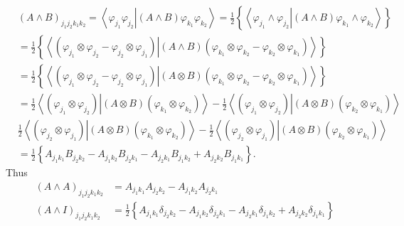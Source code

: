\documentclass[aps,preprint]{revtex4}%
\begin{document}
\begin{align}
&  \left(  A\wedge B\right)  _{j_{1}j_{2}k_{1}k_{2}}=\left\langle
\varphi_{j_{1}}\varphi_{j_{2}}\left\vert \left(  A\wedge B\right)
\varphi_{k_{1}}\varphi_{k_{2}}\right.  \right\rangle =\frac{1}{2}\left\{
\left\langle \varphi_{j_{1}}\wedge\varphi_{j_{2}}\left\vert \left(  A\wedge
B\right)  \varphi_{k_{1}}\wedge\varphi_{k_{2}}\right.  \right\rangle \right\}
\nonumber\\
&  =\frac{1}{2}\left\{  \left\langle \left(  \varphi_{j_{1}}\otimes
\varphi_{j_{2}}-\varphi_{j_{2}}\otimes\varphi_{j_{1}}\right)  \left\vert
\left(  A\wedge B\right)  \left(  \varphi_{k_{1}}\otimes\varphi_{k_{2}%
}-\varphi_{k_{2}}\otimes\varphi_{k_{1}}\right)  \right.  \right\rangle
\right\} \nonumber\\
&  =\frac{1}{2}\left\{  \left\langle \left(  \varphi_{j_{1}}\otimes
\varphi_{j_{2}}-\varphi_{j_{2}}\otimes\varphi_{j_{1}}\right)  \left\vert
\left(  A\otimes B\right)  \left(  \varphi_{k_{1}}\otimes\varphi_{k_{2}%
}-\varphi_{k_{2}}\otimes\varphi_{k_{1}}\right)  \right.  \right\rangle
\right\} \nonumber\\
&  =\frac{1}{2}\left\langle \left(  \varphi_{j_{1}}\otimes\varphi_{j_{2}%
}\right)  \left\vert \left(  A\otimes B\right)  \left(  \varphi_{k_{1}}%
\otimes\varphi_{k_{2}}\right)  \right.  \right\rangle -\frac{1}{2}\left\langle
\left(  \varphi_{j_{1}}\otimes\varphi_{j_{2}}\right)  \left\vert \left(
A\otimes B\right)  \left(  \varphi_{k_{2}}\otimes\varphi_{k_{1}}\right)
\right.  \right\rangle \nonumber\\
&  \frac{1}{2}\left\langle \left(  \varphi_{j_{2}}\otimes\varphi_{j_{1}%
}\right)  \left\vert \left(  A\otimes B\right)  \left(  \varphi_{k_{1}}%
\otimes\varphi_{k_{2}}\right)  \right.  \right\rangle -\frac{1}{2}\left\langle
\left(  \varphi_{j_{2}}\otimes\varphi_{j_{1}}\right)  \left\vert \left(
A\otimes B\right)  \left(  \varphi_{k_{2}}\otimes\varphi_{k_{1}}\right)
\right.  \right\rangle \nonumber\\
&  =\frac{1}{2}\left\{  A_{j_{1}k_{1}}B_{j_{2}k_{2}}-A_{j_{1}k_{2}}%
B_{j_{2}k_{1}}-A_{j_{2}k_{1}}B_{j_{1}k_{2}}+A_{j_{2}k_{2}}B_{j_{1}k_{1}%
}\right\}  .
\end{align}
Thus%
\begin{align}
\left(  A\wedge A\right)  _{j_{1}j_{2}k_{1}k_{2}}  &  =A_{j_{1}k_{1}}%
A_{j_{2}k_{2}}-A_{j_{1}k_{2}}A_{j_{2}k_{1}}\nonumber\\
\left(  A\wedge I\right)  _{j_{1}j_{2}k_{1}k_{2}}  &  =\frac{1}{2}\left\{
A_{j_{1}k_{1}}\delta_{j_{2}k_{2}}-A_{j_{1}k_{2}}\delta_{j_{2}k_{1}}%
-A_{j_{2}k_{1}}\delta_{j_{1}k_{2}}+A_{j_{2}k_{2}}\delta_{j_{1}k_{1}}\right\}
\end{align}%
\end{document}
